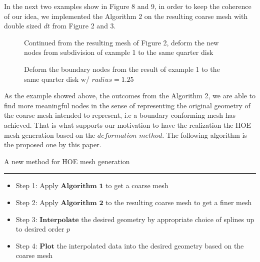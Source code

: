 \documentclass{article}
\theoremstyle{definition}
\theoremstyle{remark}
\numberwithin{equation}{section}
\numberwithin{subsection}{section}
\begin{document}
In the next two examples show in Figure 8 and 9, in order to keep the coherence of our idea, we implemented the Algorithm 2 on the resulting coarse mesh with double sized $dt$ from Figure 2 and 3.

\begin{figure}[H]
	\caption{Continued from the resulting mesh of Figure 2, deform the new nodes from subdivision of example 1 to the same quarter disk}
	\begin{center}
	\end{center}
	
\end{figure}

\begin{figure}[H]
	\caption{Deform the boundary nodes from the result of example 1 to the same quarter disk w/ $radius=1.25$}
	\begin{center}
	\end{center}
	
\end{figure}

As the example showed above, the outcomes from the Algorithm 2, we are able to find more meaningful nodes in the sense of representing the original geometry of the coarse mesh intended to represent, i.e a boundary conforming mesh has achieved. That is what supports our motivation to have the realization the HOE mesh generation based on the $deformation$ $method$. The following algorithm is the proposed one by this paper. 
\begin{algorithm}[H]
	\caption{A new method for HOE mesh generation}
	\hrule %
	\begin{itemize}
		\item Step 1: Apply $\mathbf{Algorithm}$ $\mathbf{1}$ to get a coarse mesh
		\item Step 2: Apply $\mathbf{Algorithm}$ $\mathbf{2}$ to the resulting coarse mesh to get a finer mesh		
		\item Step 3: $\mathbf{Interpolate}$ the desired geometry by appropriate choice of splines up to desired order $p$
		\item Step 4: $\mathbf{Plot}$ the interpolated data into the desired geometry based on the coarse mesh
	\end{itemize}
\end{algorithm}
\end{document}
